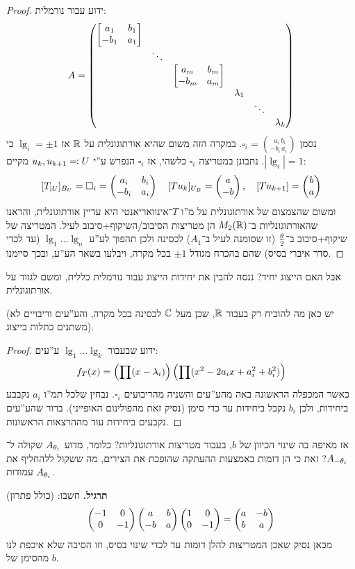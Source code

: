 \documentclass[name=רשימות אלגברה לינארית 2א]{../../../tex/classes/megasumPreamble}
\begin{document}
	
	\begin{proof}
		ידוע עבור נורמלית: 
		\[ A = \begin{pmatrix} \begin{bmatrix} a_1 & b_1 \\ -b_1 & a_1 \end{bmatrix} \\ & \ddots \\ &&\begin{bmatrix} a_m & b_m \\ -b_m & a_m \end{bmatrix} \\ &&& \lambda_1 \\ &&&&\ddots \\ &&&&&\lambda_k \end{pmatrix} \]
		נסמן $\square_i = \binom{\,\, a_i \, b_i}{-b_i \, a_i}$.
		במקרה הזה משום שהיא אורתוגונלית על $\mathbb{R}$ אז $\lg_i = \pm1$ כי $|\lg_i| = 1$. נתבונן במטריצה $\square_i$ כלשהי, אז $\square_i$ הנפרש ע''י $u_k, u_{k + 1} \eqqcolon U$ מקיים: 
		\[ [T_{|U}]_{B_U} = \square_i = \begin{pmatrix} a_i & b_i \\ -b_i & a_i \end{pmatrix}\quad [Tu_k]_{U_B} = \begin{pmatrix} a \\ -b \end{pmatrix}, \quad [Tu_{k + 1}] = \begin{pmatrix} b \\ a \end{pmatrix} \]
		ומשום שהצמצום של אורתוגונלית על מ''ו $T$־אינוואריאנטי היא עדיין אורתוגונלית, והראנו שהאורתוגונליות ב־$M_2(\mathbb{R})$ הן מטריצות הסיבוב/השיקוף+סיבוב לעיל. המטריצה של שיקוף+סיבוב ב־$\frac{\theta}{2}$ (זו שסומנה לעיל ב־$A_1$) לכסינה ולכן תהפוך לע''ע $\lg_1 \dots \lg_n$ (עד לכדי סדר איברי בסיס) שהם בהכרח מגודל $\pm 1$ בכל מקרה, ויבלעו בשאר הע''ע, ובכך סיימנו. 
	\end{proof}
	
	אבל האם הייצוג יחיד? ננסה להבין את יחידות הייצוג עבור נורמלית כללית, ומשם לגזור על אורתוגונלית. 
	
	
	(יש כאן מה להוכיח רק בעבור $\mathbb{R}$, שכן מעל $\mathbb{C}$ לכסינה בכל מקרה, והע''עים וריבויים לא משתנים כתלות בייצוג). 
	\begin{proof}
		ידוע שבעבור $\lg_1 \dots \lg_k$ ע''עים: 
		\[ f_T(x) = \left ( \prod (x - \lambda_i) \right ) \left ( \prod (x^2 - 2a_ix + a_i^2 + b_i^2) \right ) \]
		כאשר המכפלה הראשונה באה מהע''עים והשניה מהריבועים $\square_i$. נבחין שלכל תמ''ו $a_i$ נקבבע ביחידות, ולכן $b_i$ נקבל ביחידות עד כדי סימן (נסיק זאת מהפולינום האופייני). ברור שהע''עים נקבעים ביחידות עוד מההרצאות הראשונות. 
	\end{proof}
	אז מאיפה בה שינוי הכיוון של $b$, בעבור מטריצות אורתוגונליות? כלומר, מדוע $A_{\theta_i}$ שקולה ל־$A_{-\theta_i}$? זאת כי הן דומות באמצעות ההעתקה שהופכת את הצירים, מה ששקול ללהחליף את עמודות $A_{\theta_i}$. 
	
	\textbf{תרגיל. }חשבו: (כולל פתרון)
	\[ \begin{pmatrix} -1 & 0 \\ 0 & -1 \end{pmatrix}\begin{pmatrix} a & b \\ -b & a \end{pmatrix}\begin{pmatrix} 1 & 0 \\ 0 & -1 \end{pmatrix} = \begin{pmatrix} a & -b \\ b & a \end{pmatrix} \]
	מכאן נסיק שאכן המטריצות להלן דומות עד לכדי שינוי בסיס, וזו הסיבה שלא איכפת לנו מהסימן של $b$. 
	
\end{document}
